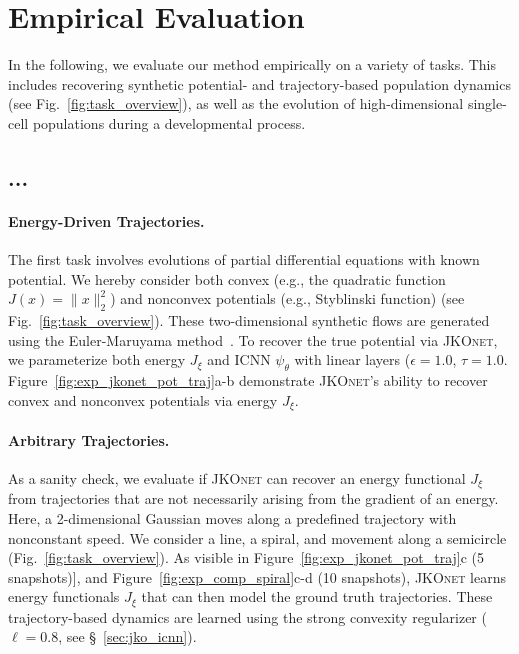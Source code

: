 \section{Empirical Evaluation} \label{sec:evaluation}
In the following, we evaluate our method empirically on a variety of tasks. This includes recovering synthetic potential- and trajectory-based population dynamics (see Fig.~\ref{fig:task_overview}), as well as the evolution of high-dimensional single-cell populations during a developmental process. 

\subsection{...} \label{sec:eval_synt}
\paragraph{Energy-Driven Trajectories.} The first task involves evolutions of partial differential equations with known potential. We hereby consider both convex (e.g., the quadratic function $J(x) = \|x\|^2_2$) and nonconvex potentials (e.g., Styblinski function) (see Fig.~\ref{fig:task_overview}). These two-dimensional synthetic flows are generated using the Euler-Maruyama method~\citep{kloeden1992stochastic}. 
To recover the true potential via \textsc{JKOnet}, we parameterize both energy $J_\xi$ and ICNN $\psi_\theta$ with linear layers ($\epsilon = 1.0$, $\tau = 1.0$.
Figure~\ref{fig:exp_jkonet_pot_traj}a-b demonstrate \textsc{JKOnet}'s ability to recover convex and nonconvex potentials via energy $J_\xi$.

\paragraph{Arbitrary Trajectories.} As a sanity check, we evaluate if \textsc{JKOnet} can recover an energy functional $J_\xi$ from trajectories that are not necessarily arising from the gradient of an energy. Here, a 2-dimensional Gaussian moves along a predefined trajectory with nonconstant speed. 
We consider a line, a spiral, and movement along a semicircle (Fig.~\ref{fig:task_overview}). As visible in Figure~\ref{fig:exp_jkonet_pot_traj}c (5 snapshots)], and Figure~\ref{fig:exp_comp_spiral}c-d (10 snapshots), \textsc{JKOnet} learns energy functionals $J_\xi$ that can then model the ground truth trajectories.
These trajectory-based dynamics are learned using the strong convexity regularizer ($\ell=0.8$, see \S~\ref{sec:jko_icnn}).

